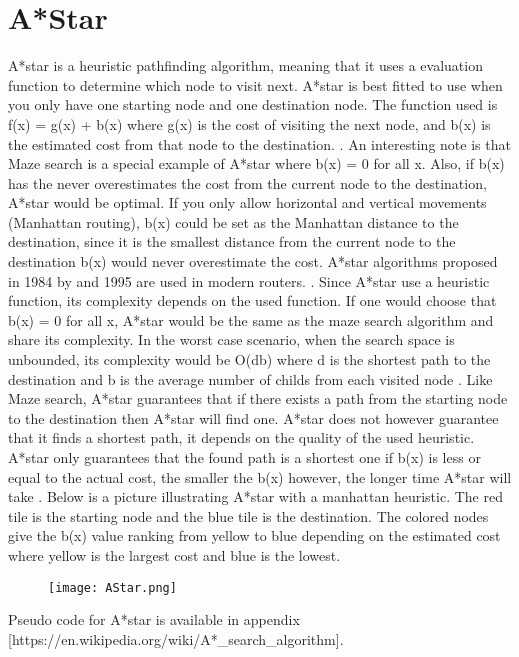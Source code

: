 \documentclass{kththesis}
\begin{document}
\section{A*Star}
A*star is a heuristic pathfinding algorithm, meaning that it uses a evaluation function to determine which node to visit next. A*star is best fitted to use when you only have one starting node and one destination node. The function used is f(x) = g(x) + b(x) where g(x) is the cost of visiting the next node, and b(x) is the estimated cost from that node to the destination. \parencite{redbloggames}. An interesting note is that Maze search is a special example of A*star where b(x) = 0 for all x. Also, if b(x) has the never overestimates the cost from the current node to the destination, A*star would be optimal. If you only allow horizontal and vertical movements (Manhattan routing), b(x) could be set as the Manhattan distance to the destination, since it is the smallest distance from the current node to the destination b(x) would never overestimate the cost. A*star algorithms proposed in 1984 by and 1995 are used in modern routers. \parencite{EDA_routing}.
Since A*star use a heuristic function, its complexity depends on the used function. If one would choose that b(x) = 0 for all x, A*star would be the same as the maze search algorithm and share its complexity. In the worst case scenario, when the search space is unbounded, its complexity would be O(db) where d is the shortest path to the destination and b is the average number of childs from each visited node \parencite{russell}. Like Maze search, A*star guarantees that if there exists a path from the starting node to the destination then A*star will find one. A*star does not however guarantee that it finds a shortest path, it depends on the quality of the used heuristic. A*star only guarantees that the found path is a shortest one if b(x) is less or equal to the actual cost, the smaller the b(x) however, the longer time A*star will take \parencite{stanford2}. Below is a picture illustrating A*star with a manhattan heuristic. The red tile is the starting node and the blue tile is the destination. The colored nodes give the b(x) value ranking from yellow to blue depending on the estimated cost where yellow is the largest cost and blue is the lowest. 
\begin{figure}[h]
\texttt{[image: AStar.png]}
\end{figure}
Pseudo code for A*star is available in appendix [https://en.wikipedia.org/wiki/A*_search_algorithm].
\end{document}

